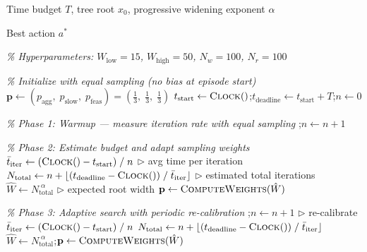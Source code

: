 \documentclass[border=10pt]{standalone}
\begin{document}
\begin{minipage}{0.85\textwidth}

\begin{algorithm}[H]
\caption{Budget-Aware MCTS with Adaptive Action Sampling}
\label{alg:budget-mcts}
\begin{algorithmic}[1]

\Require Time budget $T$, tree root $x_0$, progressive widening exponent $\alpha$

\Ensure Best action $a^*$

\Statex
\Statex \textcolor{commentgreen}{\textit{\% Hyperparameters:
$W_{\text{low}} = 15$, $W_{\text{high}} = 50$, $N_w = 100$, $N_r = 100$}}

\Statex
\Statex \textcolor{commentgreen}{\textit{\% Initialize with equal sampling (no bias at episode start)}}
\State $\mathbf{p} \gets (p_{\text{agg}},\; p_{\text{slow}},\; p_{\text{feas}}) = \left(\tfrac{1}{3},\; \tfrac{1}{3},\; \tfrac{1}{3}\right)$
\State $t_{\text{start}} \gets \textsc{Clock}()$;\quad $t_{\text{deadline}} \gets t_{\text{start}} + T$;\quad $n \gets 0$

\Statex
\Statex \textcolor{commentgreen}{\textit{\% Phase 1: Warmup --- measure iteration rate with equal sampling}}
    \State {};\quad $n \gets n + 1$
\EndWhile

\Statex
\Statex \textcolor{commentgreen}{\textit{\% Phase 2: Estimate budget and adapt sampling weights}}
\State $\bar{t}_{\text{iter}} \gets (\textsc{Clock}() - t_{\text{start}}) \;/\; n$ \hfill $\triangleright$ avg time per iteration
\State $N_{\text{total}} \gets n + \lfloor(t_{\text{deadline}} - \textsc{Clock}()) \;/\; \bar{t}_{\text{iter}}\rfloor$ \hfill $\triangleright$ estimated total iterations
\State $\hat{W} \gets N_{\text{total}}^{\;\alpha}$ \hfill $\triangleright$ expected root width
\State $\mathbf{p} \gets \Call{ComputeWeights}{\hat{W}}$

\Statex
\Statex \textcolor{commentgreen}{\textit{\% Phase 3: Adaptive search with periodic re-calibration}}
    \State {};\quad $n \gets n + 1$
     \hfill $\triangleright$ re-calibrate
        \State $\bar{t}_{\text{iter}} \gets (\textsc{Clock}() - t_{\text{start}}) \;/\; n$
        \State $N_{\text{total}} \gets n + \lfloor(t_{\text{deadline}} - \textsc{Clock}()) \;/\; \bar{t}_{\text{iter}}\rfloor$
        \State $\hat{W} \gets N_{\text{total}}^{\;\alpha}$;\quad $\mathbf{p} \gets \Call{ComputeWeights}{\hat{W}}$
    \EndIf
\EndWhile


\end{algorithmic}
\end{algorithm}
\end{minipage}
\end{document}
